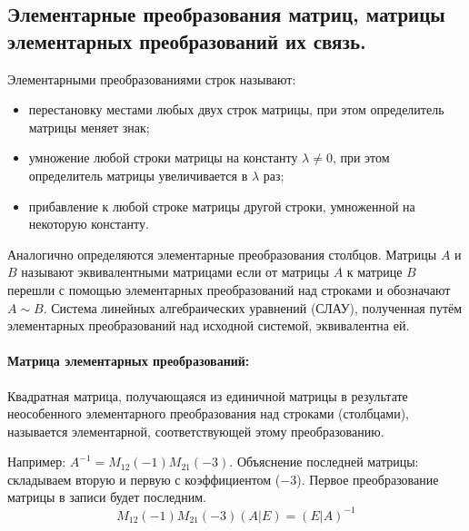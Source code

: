 \documentclass[a4paper,14pt]{article}
\begin{document}
\subsection{Элементарные преобразования матриц, матрицы элементарных преобразований их связь.}
\noindent Элементарными преобразованиями строк называют:
\begin{itemize}
	\item перестановку местами любых двух строк матрицы, при этом определитель матрицы меняет знак;
	\item умножение любой строки матрицы на константу $\lambda \ne 0$, при этом определитель матрицы увеличивается в $\lambda$ раз;
	\item прибавление к любой строке матрицы другой строки, умноженной на некоторую константу.
\end{itemize}
Аналогично определяются элементарные преобразования столбцов.
Матрицы $A$ и $B$ называют эквивалентными матрицами если от матрицы $A$ к матрице $B$ перешли с помощью элементарных преобразований над строками и обозначают $A \sim B$.
Система линейных алгебраических уравнений (СЛАУ), полученная путём элементарных преобразований над исходной системой, эквивалентна ей.
\paragraph{Матрица элементарных преобразований:}
\begin{definition}
	Квадратная матрица, получающаяся из единичной матрицы в результате неособенного элементарного преобразования над строками (столбцами), называется элементарной, соответствующей этому преобразованию.
\end{definition}
\noindent Например: $A^{-1}=M_{12}(-1)M_{21}(-3)$. Объяснение последней матрицы: складываем вторую и первую с коэффициентом  ($-3$). Первое преобразование матрицы в записи будет последним.
\[M_{12}(-1)M_{21}(-3)(A|E)=(E|A)^{-1}\]
\end{document}
